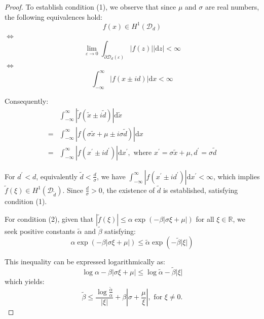 \begin{proof}
To establish condition (1), we observe that since $\mu$ and $\sigma$ are real numbers, the following equivalences hold:
\begin{equation}
f(x)\in H^1(\mathcal{D}_d)        
\end{equation}
$\Leftrightarrow$
\begin{equation}
    \lim_{\varepsilon \rightarrow 0} \int_{\partial \mathcal{D}_d(\varepsilon)}|f(z)||\mathrm{d} z|<\infty
\end{equation}
$\Leftrightarrow$
\begin{equation}
   \int_{-\infty}^{\infty}|f(x \pm id)|\mathrm{d} x<\infty 
\end{equation}

Consequently:
\begin{equation}
\begin{aligned}
         &\int_{-\infty}^{\infty}|\tilde{f}(\tilde{x}\pm i\tilde{d})|\mathrm{d} \tilde{x}\\
         = & \int_{-\infty}^{\infty}|f(\sigma \tilde{x}+\mu \pm i\sigma \tilde{d})|\mathrm{d} x \\
         = & \int_{-\infty}^{\infty}|f(x^\prime \pm id^\prime)|\mathrm{d} x^\prime, \text{ where } x^\prime=\sigma \tilde{x} +\mu,d^\prime = \sigma \tilde{d} 
\end{aligned}
\end{equation}

For $d^\prime < d$, equivalently $\tilde{d}<\frac{d}{\sigma}$, we have $ \int_{-\infty}^{\infty}|f(x^\prime\pm id^\prime)|\mathrm{d} x^\prime < \infty$, which implies $\tilde{f}(\xi)\in H^1(\mathcal{D}_{\tilde{d}})$. Since $\frac{d}{\sigma}>0$, the existence of $\tilde{d}$ is established, satisfying condition (1).

For condition (2), given that $|\tilde{f}(\xi)| \leq \alpha \exp (-\beta|\sigma\xi+\mu|)$ for all $\xi \in \mathbb{R}$, we seek positive constants $\tilde{\alpha}$ and $\tilde{\beta}$ satisfying:
\begin{equation}
     \alpha \exp (-\beta|\sigma\xi+\mu|) \leq \tilde{\alpha}\exp (-\tilde{\beta}|\xi|)
\end{equation}

This inequality can be expressed logarithmically as:
\begin{equation}
    \log \alpha -\beta|\sigma\xi+\mu| \leq \log \tilde{\alpha} -\tilde{\beta}|\xi| 
\end{equation}
which yields:
\begin{equation}
    \tilde{\beta} \leq \frac{\log \frac{\tilde{\alpha}}{\alpha}}{|\xi|}+\beta\left|\sigma+\frac{\mu}{\xi}\right|, \text{ for } \xi\neq 0.
\end{equation}


\end{proof}
